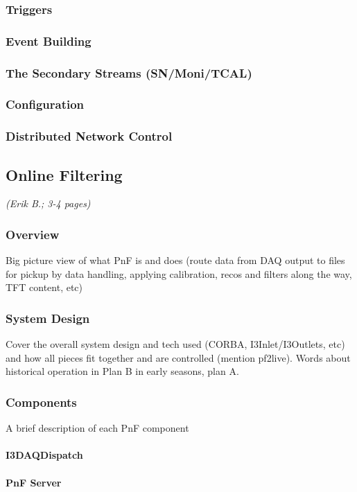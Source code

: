 \subsubsection{Triggers}
\subsubsection{Event Building}
\subsubsection{The Secondary Streams (SN/Moni/TCAL)}
\subsubsection{Configuration}
\subsubsection{Distributed Network Control}

\subsection{Online Filtering}
\textsl{(Erik B.; 3-4 pages)}
\subsubsection{Overview}
Big picture view of what PnF is and does (route data from DAQ output to
files for pickup by data handling, applying calibration, recos and
filters along the way, TFT content, etc)

\subsubsection{System Design}
Cover the overall system design and tech used (CORBA, I3Inlet/I3Outlets,
etc) and how all pieces fit together and are controlled (mention
pf2live). Words about historical operation in Plan B in early seasons,
plan A.

\subsubsection{Components}
A brief description of each PnF component
\paragraph{I3DAQDispatch}
\paragraph{PnF Server}
